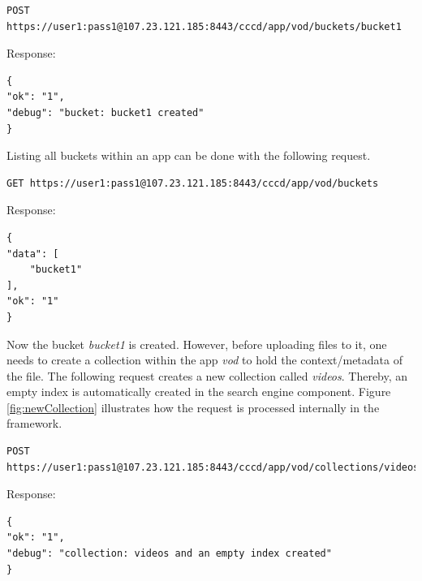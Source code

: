 \begin{code}
\begin{verbatim}
POST https://user1:pass1@107.23.121.185:8443/cccd/app/vod/buckets/bucket1
\end{verbatim}
Response:
\begin{verbatim}
{
"ok": "1",
"debug": "bucket: bucket1 created"
}
\end{verbatim}
\end{code}

Listing all buckets within an app can be done with the following request.
\begin{code}
\begin{verbatim}
GET https://user1:pass1@107.23.121.185:8443/cccd/app/vod/buckets
\end{verbatim}
Response:
\begin{verbatim}
{
"data": [
	"bucket1"
],
"ok": "1"
}
\end{verbatim}
\end{code}

Now the bucket \textit{bucket1} is created. However, before uploading files to it, one needs to create a collection within the app \textit{vod} to hold the context/metadata of the file. The following request creates a new collection called \textit{videos}. Thereby, an empty index is automatically created in the search engine component. Figure \ref{fig:newCollection} illustrates how the request is processed internally in the framework.

\begin{code}
\begin{verbatim}
POST https://user1:pass1@107.23.121.185:8443/cccd/app/vod/collections/videos
\end{verbatim}
Response:
\begin{verbatim}
{
"ok": "1",
"debug": "collection: videos and an empty index created"
}
\end{verbatim}
\end{code}

